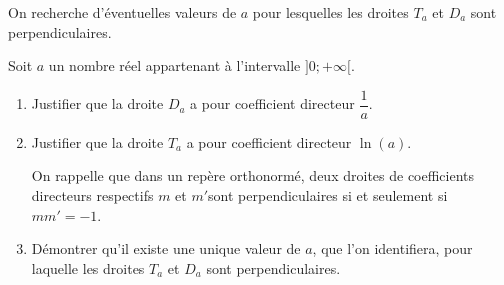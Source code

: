 On recherche d'éventuelles valeurs de $a$ pour lesquelles les droites $T_a$ et $D_a$ sont perpendiculaires.

Soit $a$ un nombre réel appartenant à l'intervalle $]0; +\infty[$.

\begin{enumerate}
	\item Justifier que la droite $D_a$ a pour coefficient directeur $\dfrac{1}{a}$.
	\item Justifier que la droite $T_a$ a pour coefficient directeur $\ln(a)$.
	
	On rappelle que dans un repère orthonormé, deux droites de coefficients directeurs respectifs $m$ et $m'$sont perpendiculaires si et seulement si $mm' = -1$.
	\item Démontrer qu'il existe une unique valeur de $a$, que l'on identifiera, pour laquelle les droites $T_a$ et $D_a$ sont perpendiculaires.
\end{enumerate}
